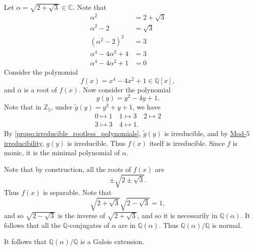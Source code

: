 \documentclass[notoc,notitlepage,nobib]{tufte-book}
\begin{document}
\begin{eg}
  Let $\alpha = \sqrt{2 + \sqrt{3}} \in \mathbb{C}$. Note that
  \begin{align*}
    \alpha^2                  & = 2 + \sqrt{3} \\
    \alpha^2 - 2              & = \sqrt{3} \\
    (\alpha^2 - 2)^2          & = 3 \\
    \alpha^4 - 4 \alpha^2 + 4 & = 3 \\
    \alpha^4 - 4 \alpha^2 + 1 & = 0
  \end{align*}
  Consider the polynomial
  \begin{equation*}
    f(x) = x^4 - 4x^2 + 1 \in \mathbb{Q}[x],
  \end{equation*}
  and $\alpha$ is a root of $f(x)$. Now consider the polynomial
  \begin{equation*}
    g(y) = y^2 - 4y + 1.
  \end{equation*}
  Note that in $\mathbb{Z}_5$, under $\tilde{g}(y) = y^2 + y + 1$, we have
  \begin{gather*}
    0 \mapsto 1 \quad 1 \mapsto 3 \quad 2 \mapsto 2 \\
    3 \mapsto 3 \quad 4 \mapsto 1.
  \end{gather*}
  By \cref{propo:irreducible_rootless_polynomials}, $\tilde{g}(y)$ is
  irreducible, and by \hyperref[propo:mod_p_irreducibility_test]{Mod-$5$
  irreducibility}, $g(y)$ is irreducible. Thus $f(x)$ itself is irreducible.
  Since $f$ is monic, it is the minimal polynomial of $\alpha$.

  Note that by construction, all the roots of $f(x)$ are
  \begin{equation*}
    \pm \sqrt{2 \pm \sqrt{3}}.
  \end{equation*}
  Thus $f(x)$ is separable. Note that
  \begin{equation*}
    \sqrt{2 + \sqrt{3}} \sqrt{2 - \sqrt{3}} = 1,
  \end{equation*}
  and so $\sqrt{2 - \sqrt{3}}$ is the inverse of $\sqrt{2 + \sqrt{3}}$, and so
  it is necessarily in $\mathbb{Q}(\alpha)$. It follows that all the
  $\mathbb{Q}$-conjugates of $\alpha$ are in $\mathbb{Q}(\alpha)$. Thus
  $\mathbb{Q}(\alpha) / \mathbb{Q}$ is normal.

  It follows that $\mathbb{Q}(\alpha) / \mathbb{Q}$ is a Galois extension.


\end{eg}
\end{document}
